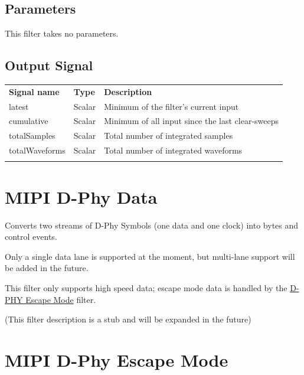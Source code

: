 \subsection{Parameters}

This filter takes no parameters.

\subsection{Output Signal}

\begin{tabularx}{16cm}{llX}
\thickhline
\textbf{Signal name} & \textbf{Type} & \textbf{Description} \\
\thickhline
latest & Scalar & Minimum of the filter's current input \\
\thinhline
cumulative & Scalar & Minimum of all input since the last clear-sweeps\\
\thinhline
totalSamples & Scalar & Total number of integrated samples \\
\thinhline
totalWaveforms & Scalar & Total number of integrated waveforms \\
\thickhline
\end{tabularx}

\pagebreak
\section{MIPI D-Phy Data}
\label{filter:dphydata}

Converts two streams of D-Phy Symbols (one data and one clock) into bytes and control events.

Only a single data lane is supported at the moment, but multi-lane support will be added in the future.

This filter only supports high speed data; escape mode data is handled by the \hyperref[filter:dphyescape]{D-PHY Escape
Mode} filter.

(This filter description is a stub and will be expanded in the future)

\pagebreak
\section{MIPI D-Phy Escape Mode}
\label{filter:dphyescape}


